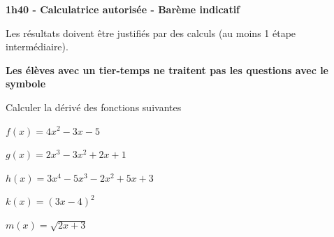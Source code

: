 \documentclass[12pt,a4paper]{article}  %
\begin{document}
\graphicspath{{../images/}}

\begin{center}

\end{center}


\begin{center}\textbf{1h40 - Calculatrice autorisée - Barème indicatif}\end{center}


\begin{center}
Les résultats doivent être justifiés par des calculs (au moins 1 étape intermédiaire).
\end{center}

\begin{center}\textbf{Les élèves avec un tier-temps ne traitent pas les questions avec  le symbole }\end{center}


Calculer la dérivé des fonctions suivantes
\begin{enumMet}
	\item $f(x)=4 x^{2}-3 x-5$\quad {}\quad {}
	\item {} $g(x)=2 x^{3}-3 x^{2}+2 x+1$\quad {}\quad {}
	\item $h(x)=3x^4-5x^3-2x^2+5x+3$\quad {}\quad {}
	\item {} $k(x)=(3x-4)^{2}$\quad {}\quad {}
	\item $m(x)=\sqrt{2x+3}$ \quad {}\quad {}
\end{enumMet}
\end{document}
